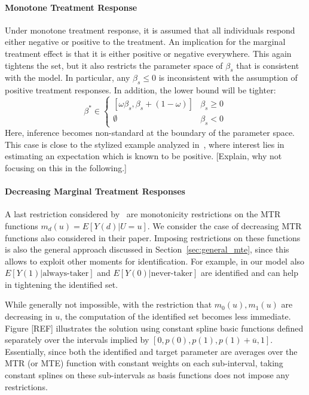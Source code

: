 \documentclass[12pt,a4paper,english]{article} %
\numberwithin{equation}{section}
\theoremstyle{definition}
\theoremstyle{remark}
\theoremstyle{plain}
\begin{document}
\paragraph{Monotone Treatment Response}
Under monotone treatment response, it is assumed that all individuals respond either negative or positive to the treatment.
An implication for the marginal treatment effect is that it is either positive or negative everywhere.
This again tightens the set, but it also restricts the parameter space of $\beta_s$ that is consistent with the model.
In particular, any $\beta_s \leq 0$ is inconsistent with the assumption of positive treatment responses.
In addition, the lower bound will be tighter:
\begin{equation*}
  \beta^* \in \begin{cases}
    [\omega\beta_s, \beta_s + (1 - \omega)] & \beta_s \geq 0 \\
    \emptyset & \beta_s < 0
  \end{cases}
\end{equation*}
Here, inference becomes non-standard at the boundary of the parameter space.
This case is close to the stylized example analyzed in~\cite{andrews1999estimation}, where interest lies in estimating an expectation which is known to be positive.
[Explain, why not focusing on this in the following.]

\paragraph{Decreasing Marginal Treatment Responses}
A last restriction considered by~\cite{mogstad2018using} are monotonicity restrictions on the MTR functions $m_d(u) = E[Y(d)|U=u]$.
We consider the case of decreasing MTR functions also considered in their paper.
Imposing restrictions on these functions is also the general approach discussed in Section~\ref{sec:general_mte}, since this allows to exploit other moments for identification.
For example, in our model also $E[Y(1)|\text{always-taker}]$ and $E[Y(0)|\text{never-taker}]$ are identified and can help in tightening the identified set.

While generally not impossible, with the restriction that $m_0(u), m_1(u)$ are decreasing in $u$, the computation of the identified set becomes less immediate.
Figure [REF] illustrates the solution using constant spline basic functions defined separately over the intervals implied by $[0, p(0), p(1), p(1) + \overline{u}, 1]$.
Essentially, since both the identified and target parameter are averages over the MTR (or MTE) function with constant weights on each sub-interval, taking constant splines on these sub-intervals as basis functions does not impose any restrictions.
\end{document}
